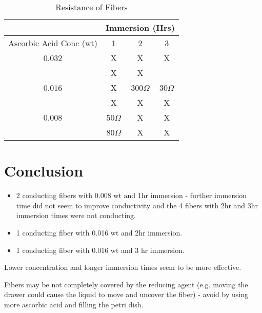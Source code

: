 \documentclass{article}
\begin{document}
\begin{table}[h!]
\centering
\begin{tabular}{ |c|c|c|c| } 
 \hline
& \multicolumn{3}{l|}{Immersion (Hrs)} \\ \hline
Ascorbic Acid Conc (wt) & 1 & 2 & 3  \\ 
 \hline
 0.032  & X & X & X \\ 
 & X & X   &  \\ 
 \hline
 0.016 & X & 300$\Omega$ & 30$\Omega$ \\ 
& X & X & X  \\ 
 \hline
  0.008 & 50$\Omega$ & X & X\\ 
& 80$\Omega$ & X & X  \\ 
 \hline
\end{tabular}
 \caption{Resistance of Fibers}
\label{table:1}
\end{table}
\pagebreak
\section{Conclusion}
\begin{itemize}
    \item 2 conducting fibers with 0.008 wt and 1hr immersion - further immersion time did not seem to improve conductivity and the 4 fibers with 2hr and 3hr immersion times were not conducting.
    \item 1 conducting fiber with 0.016 wt and 2hr immersion.

    \item 1 conducting fiber with 0.016 wt and 3 hr immersion.
\end{itemize}


Lower concentration and longer immersion times seem to be more effective.

Fibers may be not completely covered by the reducing agent (e.g. moving the drawer could cause the liquid to move and uncover the fiber) - avoid  by using more ascorbic acid and filling the petri dish.
\end{document}
